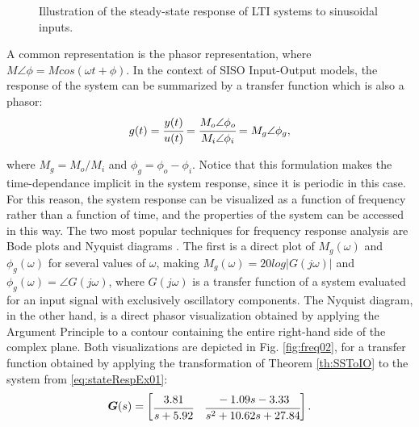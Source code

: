 \documentclass[a4paper,11pt]{book}
\numberwithin{figure}{chapter}
\numberwithin{equation}{chapter}
\numberwithin{table}{chapter}
\theoremstyle{definition}
\begin{document}
\begin{figure}[ht]
    \caption{Illustration of the steady-state response of LTI systems to sinusoidal inputs.}
    \label{fig:freq01}
\end{figure}

A common representation is the phasor representation, where $M \angle \phi = M cos(\omega t + \phi)$. In the context of SISO Input-Output models, the response of the system can be summarized by a transfer function which is also a phasor:
\begin{equation}
    g(t) = \cfrac{y(t)}{u(t)} = \cfrac{M_o \angle \phi_o}{M_i \angle \phi_i} = M_g \angle \phi_g
,\end{equation}

\noindent where $M_g = M_o / M_i$ and $\phi_g = \phi_o - \phi_i$. Notice that this formulation makes the time-dependance implicit in the system response, since it is periodic in this case. For this reason, the system response can be visualized as a function of frequency rather than a function of time, and the properties of the system can be accessed in this way. The two most popular techniques for frequency response analysis are Bode plots \cite{Bode:1945} and Nyquist diagrams \cite{Nyquist:1932}. The first is a direct plot of $M_g(\omega)$ and $\phi_g(\omega)$ for several values of $\omega$, making $M_g(\omega) = 20 log \left| G(j\omega) \right|$ and $\phi_g(\omega) = \angle G(j\omega)$, where $G(j\omega)$ is a transfer function of a system evaluated for an input signal with exclusively oscillatory components. The Nyquist diagram, in the other hand, is a direct phasor visualization obtained by applying the Argument Principle to a contour containing the entire right-hand side of the complex plane. Both visualizations are depicted in Fig. \ref{fig:freq02}, for a transfer function obtained by applying the transformation of Theorem \ref{th:SSToIO} to the system from \eqref{eq:stateRespEx01}:
\begin{equation} \label{eq:IOSys01}
    \bm{G}(s) = \begin{bmatrix}
        \cfrac{3.81}{s + 5.92} & \cfrac{-1.09s - 3.33}{s^2 + 10.62s + 27.84}
    \end{bmatrix}
.\end{equation}
\end{document}
